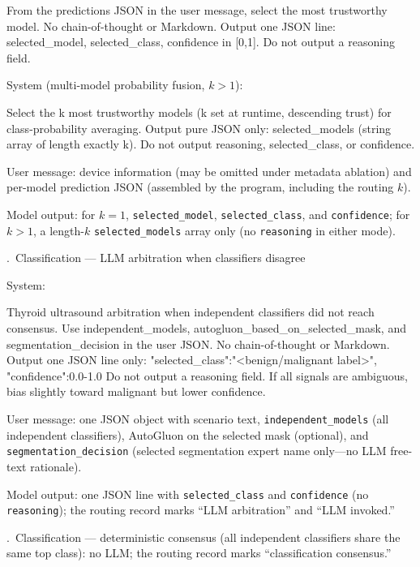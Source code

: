 \begin{responseappendixprose}
\begin{promptverbatim}
From the predictions JSON in the user message, select the most trustworthy model.
No chain-of-thought or Markdown. Output one JSON line: selected_model, selected_class, confidence in [0,1]. Do not output a reasoning field.
\end{promptverbatim}
System (multi-model probability fusion, $k>1$):\par
\begin{promptverbatim}
Select the k most trustworthy models (k set at runtime, descending trust) for class-probability averaging.
Output pure JSON only: selected_models (string array of length exactly k). Do not output reasoning, selected_class, or confidence.
\end{promptverbatim}
User message: device information (may be omitted under metadata ablation) and per-model prediction JSON (assembled by the program, including the routing $k$).\par
Model output: for $k{=}1$, \texttt{selected\_model}, \texttt{selected\_class}, and \texttt{confidence}; for $k>1$, a length-$k$ \texttt{selected\_models} array only (no \texttt{reasoning} in either mode).\par
{}.~Classification --- LLM arbitration when classifiers disagree
\par
System:\par
\begin{promptverbatim}
Thyroid ultrasound arbitration when independent classifiers did not reach consensus.
Use independent_models, autogluon_based_on_selected_mask, and segmentation_decision in the user JSON.
No chain-of-thought or Markdown. Output one JSON line only:
{"selected_class":"<benign/malignant label>", "confidence":0.0-1.0}
Do not output a reasoning field. If all signals are ambiguous, bias slightly toward malignant but lower confidence.
\end{promptverbatim}
User message: one JSON object with scenario text, \texttt{independent\_models} (all independent classifiers), AutoGluon on the selected mask (optional), and \texttt{segmentation\_decision} (selected segmentation expert name only---no LLM free-text rationale).\par
Model output: one JSON line with \texttt{selected\_class} and \texttt{confidence} (no \texttt{reasoning}); the routing record marks ``LLM arbitration'' and ``LLM invoked.''\par
{}.~Classification --- deterministic consensus (all independent classifiers share the same top class): no LLM; the routing record marks ``classification consensus.''

\end{responseappendixprose}
